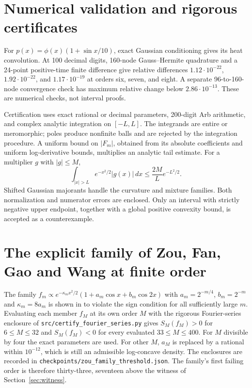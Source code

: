 \documentclass[11pt]{article}
\begin{document}
\section{Numerical validation and rigorous certificates}
For $p(x)=\phi(x)(1+\sin x/10)$, exact Gaussian conditioning gives its
heat convolution. At 100 decimal digits, 160-node Gauss--Hermite quadrature
and a 24-point positive-time finite difference give relative differences
$1.12\cdot10^{-22}$, $1.92\cdot10^{-22}$, and $1.17\cdot10^{-19}$
at orders six, seven, and eight. A separate 96-to-160-node convergence
check has maximum relative change below $2.86\cdot10^{-13}$.
These are numerical checks, not interval proofs.

Certification uses exact rational or decimal parameters, 200-digit Arb
arithmetic, and complex analytic integration on $[-L,L]$. The integrands
are entire or meromorphic; poles produce nonfinite balls and are rejected
by the integration procedure. A uniform bound on $|F_m|$, obtained from
its absolute coefficients and uniform log-derivative bounds, multiplies an
analytic tail estimate. For a multiplier $g$ with $|g|\le M$,
\[
 \int_{|x|>L}e^{-x^2/2}|g(x)|\,dx\le \frac{2M}{L}e^{-L^2/2}.
\]
Shifted Gaussian majorants handle the curvature and mixture families.
Both normalization and numerator errors are enclosed. Only an interval with
strictly negative upper endpoint, together with a global positive convexity
bound, is accepted as a counterexample.






\section{The explicit family of Zou, Fan, Gao and Wang at finite order}
The family $f_m\propto e^{-\kappa_mx^2/2}(1+a_m\cos x+b_m\cos 2x)$ with
$a_m=2^{-m/4}$, $b_m=2^{-m}$ and $\kappa_m=8a_m$ is shown in \cite{zou} to
violate the sign condition for all sufficiently large $m$. Evaluating each
member $f_M$ at its own order $M$ with the rigorous Fourier-series enclosure of
\texttt{src/certify\_fourier\_series.py} gives $S_M(f_M)>0$ for $6\le M\le32$
and $S_M(f_M)<0$ for every evaluated $33\le M\le400$. For $M$ divisible by four
the exact parameters are used. For other $M$, $a_M$ is replaced by a rational
within $10^{-12}$, which is still an admissible log-concave density. The
enclosures are recorded in \texttt{checkpoints/zou\_family\_threshold.json}.
The family's first failing order is therefore thirty-three, seventeen above the
witness of Section~\ref{sec:witness}.
\end{document}
